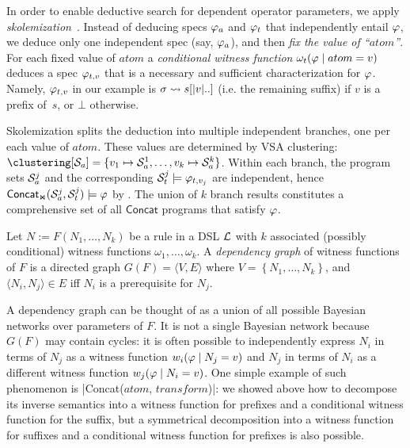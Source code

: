 In order to enable deductive search for dependent operator parameters, we apply \emph{skolemization}~\cite{modeltheory}.
Instead of deducing specs $\spec_a$ and $\spec_t$ that independently entail $\spec$, we deduce only one
independent spec (say, $\spec_a$), and then \emph{fix the value of ``$atom$''}.
For each fixed value of $atom$ a \emph{conditional witness function} $\omega_t(\spec \assuming atom = v)$ deduces a
spec $\spec_{t,v}$ that is a necessary and sufficient characterization for $\spec$.
Namely, $\spec_{t,v}$ in our example is $\state \tospec s[|v|..]$ (i.e. the remaining suffix) if $v$ is a prefix of~$s$,
or $\bot$ otherwise.

Skolemization splits the deduction into multiple independent branches, one per each value of $atom$.
These values are determined by VSA clustering: \mbox{$\clustering[\vsa_a] = \{v_1 \mapsto \vsa_a^1,
\dots, v_k \mapsto \vsa_a^k\}$}.
Within each branch, the program sets $\vsa_a^j$ and the corresponding $\vsa_t^j \models \spec_{t,v_j}$ are
independent, hence $\joinCons[\mathsf{Concat}](\vsa_a^j, \vsa_t^j) \models \spec$ by .
The union of $k$ branch results constitutes a comprehensive set of all $\mathsf{Concat}$ programs that satisfy $\spec$.

\begin{defn}
    Let $N := F(N_1, \dots, N_k)$ be a rule in a DSL $\dsl$ with $k$ associated (possibly conditional) witness functions
    $\omega_1, \dots, \omega_k$.
    A \emph{dependency graph} of witness functions of $F$ is a directed graph $G(F) = \langle V, E\rangle$ where $V=
    \left\{N_1, \dots, N_k\right\}$, and $\langle N_i, N_j\rangle \in E$ iff $N_i$ is a prerequisite for $N_j$.
\end{defn}

A dependency graph can be thought of as a union of all possible Bayesian networks over parameters of $F$.
It is not a single Bayesian network because $G(F)$ may contain cycles: it is often possible to independently express
$N_i$ in terms
of $N_j$ as a witness function $w_i(\spec \assuming N_j = v)$ and $N_j$ in terms of $N_i$ as a different witness
function $w_j(\spec \assuming N_i = v)$.
One simple example of such phenomenon is \dslinline|Concat($atom$, $transform$)|: we showed above how to decompose its
inverse semantics into a witness function for prefixes and a conditional witness function for the suffix, but a
symmetrical decomposition into a witness function for suffixes and a conditional witness function for prefixes is also
possible.

